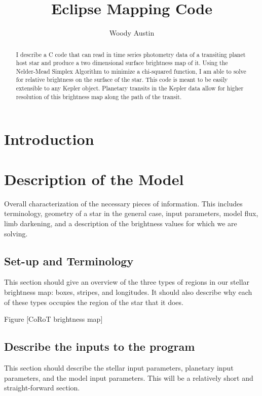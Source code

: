 \documentclass[iop]{emulateapj}
\begin{document}
\title{Eclipse Mapping Code}
\author{Woody Austin}

\begin{abstract}
I describe a C code that can read in time series photometry data of a transiting planet host star and produce a two dimensional surface brightness map of it. Using the Nelder-Mead Simplex Algorithm to minimize a chi-squared function, I am able to solve for relative brightness on the surface of the star. This code is meant to be easily extensible to any Kepler object. Planetary transits in the Kepler data allow for higher resolution of this brightness map along the path of the transit.
\end{abstract}
\maketitle

\section{Introduction \label{intro}}
\vspace{9mm}

\section{Description of the Model \label{description}}
Overall characterization of the necessary pieces of information. This includes terminology, geometry of a star in the general case, input parameters, model flux, limb darkening, and a description of the brightness values for which we are solving.
\subsection{Set-up and Terminology \label{description}}
This section should give an overview of the three types of regions in our stellar brightness map: boxes, stripes, and longitudes. It should also describe why each of these types occupies the region of the star that it does.

Figure [CoRoT brightness map]
\subsection{Describe the inputs to the program}
	This section should describe the stellar input parameters, planetary input parameters, and the model input parameters.
	This will be a relatively short and straight-forward section.
\end{document}

